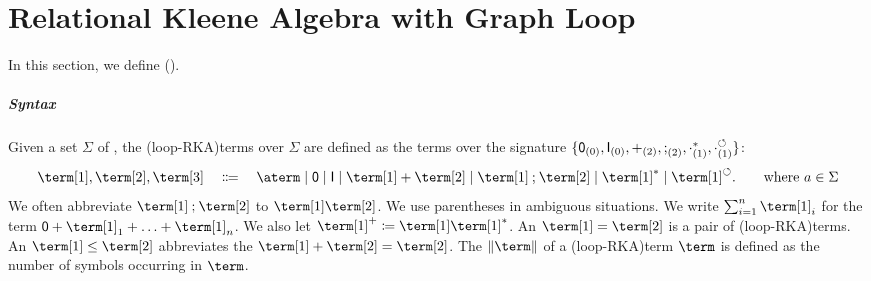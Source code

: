 \documentclass[a4paper,UKenglish,cleveref, autoref, thm-restate]{lipics-v2021}
\DeclarePairedDelimiter\set{\{}{\}}
\newcommand{\const}[1]{\mathsf{#1}}
\newcommand{\bl}{\cdot}
\newcommand{\defeq}{\coloneq}
\newcommand{\union}{\mathbin{+}}
\newcommand{\id}{\const{I}}
\newcommand{\emp}{\const{0}}
\newcommand{\compo}{\mathbin{;}}
\newcommand{\lop}{\circlearrowleft}
\newcommand{\vsig}{\Sigma}
\begin{document}
%
%
%
%
%
%
%
%
%
%
%
%
%
%
%
%
%
%

%
%
%
%
%
%
%
%

%
%
%
%
%
%
%
%
%
%
%
%
%
%
%
%
%
%
%
%
%
%
%
%
%
%
%
%
%
%
%
%
%
%
%
%
%
%
%
%
%
%
%
%
%
%
%
%
%
%
%
%
%

%
%
%
%
%
%
%
%
%
%
%
%
%
%
%
%
%
%
%
%
%
%
%
%
%
%
%
%
%
%
%
%
%
%
%
%
%
%
%
%
%
%
%
%
%
%
%
%
%
%
%
%
%
%
%
%
%
%
%

%
%
%
%
%
%
%

\section{Relational Kleene Algebra with Graph Loop}\label{section: RKA with graph loop}
\AP
In this section,
we define \intro*{} (\reintro*{}).

\subparagraph*{Syntax}
\AP
Given a set $\vsig$ of \intro*{},
the \intro*\kl(loop-RKA){terms} over $\vsig$ 
are defined as the terms over the signature $\set{\emp_{(0)}, \id_{(0)}, \union_{(2)}, \compo_{(2)}, \bl^{*}_{(1)}, \bl^{\lop}_{(1)}}$: 
\begin{align*}
    \term[1], \term[2], \term[3] \quad\Coloneqq\quad \aterm \mid \emp \mid \id \mid \term[1] \union \term[2] \mid \term[1] \compo \term[2] \mid \term[1]^* \mid \term[1]^{\lop}. \tag*{where $a \in \vsig$}
\end{align*}
We often abbreviate $\term[1] \compo \term[2]$ to $\term[1] \term[2]$.
We use parentheses in ambiguous situations.
We write $\sum_{i = 1}^{n} \term[1]_i$ for the term $\emp \union \term[1]_1 \union \dots \union \term[1]_n$.
We also let $\term[1]^{+} \defeq \term[1] \term[1]^*$.
\AP
An \intro*{} $\term[1] = \term[2]$ is a pair of \kl(loop-RKA){terms}.
An \intro*{} $\term[1] \le \term[2]$ abbreviates the  $\term[1] \union \term[2] = \term[2]$.
The \intro*{} $\|\term\|$ of a \kl(loop-RKA){term} $\term$ is defined as the number of symbols occurring in $\term$.

%
%
%
%
%
%
%
%
%
%
%
\end{document}
